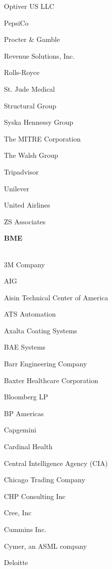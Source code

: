 \documentclass[twoside]{article}
\begin{document}
\begin{center}
\begin{multicols}{5}
\begin{FlushLeft}
\begin{compactitem}
\item Optiver US LLC
\item PepsiCo
\item Procter \& Gamble
\item Revenue Solutions, Inc.
\item Rolls-Royce
\item St. Jude Medical
\item Structural Group
\item Syska Hennessy Group
\item The MITRE Corporation
\item The Walsh Group
\item Tripadvisor
\item Unilever
\item United Airlines
\item ZS Associates
\end{compactitem}
        \end{FlushLeft}
        \vspace{1em}
        {\fontsize{14}{16}\selectfont \bf BME}\\
        \vspace{-1em}
        ~\hrulefill~
        \vspace{-.9em}
        \begin{FlushLeft}
        \begin{compactitem}
        \item 3M Company
\item AIG
\item Aisin Technical Center of America
\item ATS Automation
\item Axalta Coating Systems
\item BAE Systems
\item Barr Engineering Company
\item Baxter Healthcare Corporation
\item Bloomberg LP
\item BP Americas
\item Capgemini
\item Cardinal Health
\item Central Intelligence Agency (CIA)
\item Chicago Trading Company
\item CHP Consulting Inc
\item Cree, Inc
\item Cummins Inc.
\item Cymer, an ASML company
\item Deloitte

\end{compactitem}
\end{FlushLeft}
\end{multicols}
\end{center}
\end{document}
